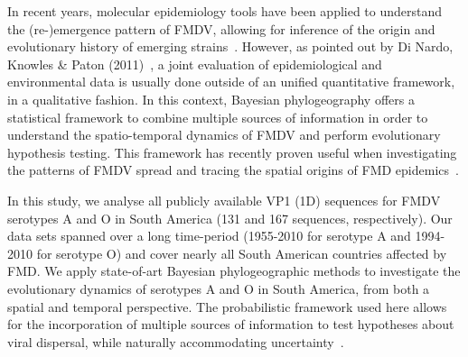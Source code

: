 \documentclass[10pt]{article}
\begin{document}
In recent years, molecular epidemiology tools have been applied to understand the (re-)emergence pattern of FMDV, allowing for inference of the origin and evolutionary history of emerging strains~\cite{Perez2001,Malirat2007,andean,Malirat2011,Maradei2013}.
However, as pointed out by Di Nardo, Knowles \&  Paton (2011)~\cite{combining}, a joint evaluation of epidemiological and environmental data is usually done outside of an unified quantitative framework, in a qualitative fashion.
In this context, Bayesian phylogeography offers a statistical framework to combine multiple sources of information in order to understand the spatio-temporal dynamics of FMDV and perform evolutionary hypothesis testing.
This framework has recently proven useful when investigating the patterns of FMDV spread and tracing the spatial origins of FMD epidemics~\cite{Carvalho2013,bulgaria,phymal,hall2013}.

In this study, we analyse all publicly available VP1 (1D) sequences for FMDV serotypes A and O in South America (131 and 167 sequences, respectively).
Our data sets spanned over a long time-period (1955-2010 for serotype A and 1994-2010 for serotype O)  and cover nearly all South American countries affected by FMD.
We apply state-of-art Bayesian phylogeographic methods to investigate the evolutionary dynamics of serotypes A and O in South America, from both a spatial and temporal perspective.
The probabilistic framework used here allows for the incorporation of multiple sources of information to test hypotheses about viral dispersal, while naturally accommodating uncertainty~\cite{roots,towards}.
\end{document}
